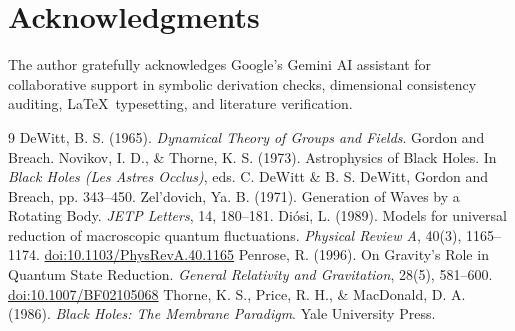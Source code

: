 \documentclass[11pt,a4paper]{article}
\begin{document}
\section*{Acknowledgments}
The author gratefully acknowledges Google's Gemini AI assistant for collaborative support in symbolic derivation checks, dimensional consistency auditing, \LaTeX\ typesetting, and literature verification.

\begin{thebibliography}{9}
 DeWitt, B. S. (1965). \emph{Dynamical Theory of Groups and Fields}. Gordon and Breach.
 Novikov, I. D., \& Thorne, K. S. (1973). Astrophysics of Black Holes. In \emph{Black Holes (Les Astres Occlus)}, eds. C. DeWitt \& B. S. DeWitt, Gordon and Breach, pp. 343--450.
 Zel'dovich, Ya. B. (1971). Generation of Waves by a Rotating Body. \emph{JETP Letters}, 14, 180--181.
 Diósi, L. (1989). Models for universal reduction of macroscopic quantum fluctuations. \emph{Physical Review A}, 40(3), 1165--1174. \href{https://doi.org/10.1103/PhysRevA.40.1165}{doi:10.1103/PhysRevA.40.1165}
 Penrose, R. (1996). On Gravity's Role in Quantum State Reduction. \emph{General Relativity and Gravitation}, 28(5), 581--600. \href{https://doi.org/10.1007/BF02105068}{doi:10.1007/BF02105068}
 Thorne, K. S., Price, R. H., \& MacDonald, D. A. (1986). \emph{Black Holes: The Membrane Paradigm}. Yale University Press.
\end{thebibliography}
\end{document}
